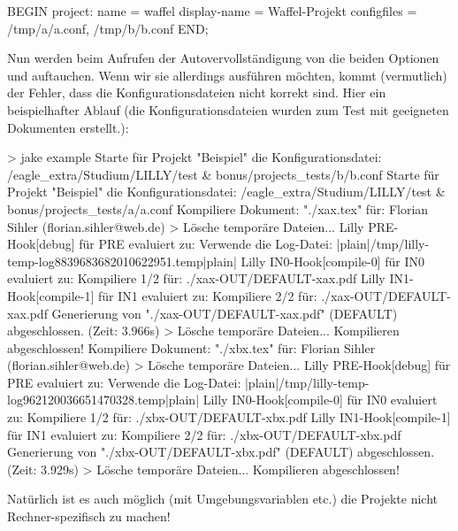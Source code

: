 \begin{bemerkung}
\begin{gepard}
BEGIN project:
    name          = waffel
    display-name  = Waffel-Projekt
    configfiles   = /tmp/a/a.conf, /tmp/b/b.conf
END;
\end{gepard}
Nun werden beim Aufrufen der Autovervollständigung von \Jake die beiden Optionen  und  auftauchen. Wenn wir sie allerdings ausführen möchten, kommt (vermutlich) der Fehler, dass die Konfigurationsdateien nicht korrekt sind.
Hier ein beispielhafter Ablauf (die Konfigurationsdateien wurden zum Test mit geeigneten Dokumenten erstellt.):
{
\begin{plainbash}
> jake example
Starte für Projekt "Beispiel" die Konfigurationsdatei: /eagle_extra/Studium/LILLY/test & bonus/projects_tests/b/b.conf
Starte für Projekt "Beispiel" die Konfigurationsdatei: /eagle_extra/Studium/LILLY/test & bonus/projects_tests/a/a.conf
Kompiliere Dokument: "./xax.tex" für: Florian Sihler (florian.sihler@web.de)
> Lösche temporäre Dateien...
Lilly PRE-Hook[debug] für PRE evaluiert zu: Verwende die Log-Datei: |plain|/tmp/lilly-temp-log8839683682010622951.temp|plain|
Lilly IN0-Hook[compile-0] für IN0 evaluiert zu: Kompiliere 1/2 für: ./xax-OUT/DEFAULT-xax.pdf
Lilly IN1-Hook[compile-1] für IN1 evaluiert zu: Kompiliere 2/2 für: ./xax-OUT/DEFAULT-xax.pdf
Generierung von "./xax-OUT/DEFAULT-xax.pdf" (DEFAULT) abgeschlossen. (Zeit: 3.966s)
> Lösche temporäre Dateien...
Kompilieren abgeschlossen!
Kompiliere Dokument: "./xbx.tex" für: Florian Sihler (florian.sihler@web.de)
> Lösche temporäre Dateien...
Lilly PRE-Hook[debug] für PRE evaluiert zu: Verwende die Log-Datei: |plain|/tmp/lilly-temp-log962120036651470328.temp|plain|
Lilly IN0-Hook[compile-0] für IN0 evaluiert zu: Kompiliere 1/2 für: ./xbx-OUT/DEFAULT-xbx.pdf
Lilly IN1-Hook[compile-1] für IN1 evaluiert zu: Kompiliere 2/2 für: ./xbx-OUT/DEFAULT-xbx.pdf
Generierung von "./xbx-OUT/DEFAULT-xbx.pdf" (DEFAULT) abgeschlossen. (Zeit: 3.929s)
> Lösche temporäre Dateien...
Kompilieren abgeschlossen!
\end{plainbash}
}
Natürlich ist es auch möglich (mit Umgebungsvariablen etc.) die Projekte nicht Rechner-spezifisch zu machen!
\end{bemerkung}

